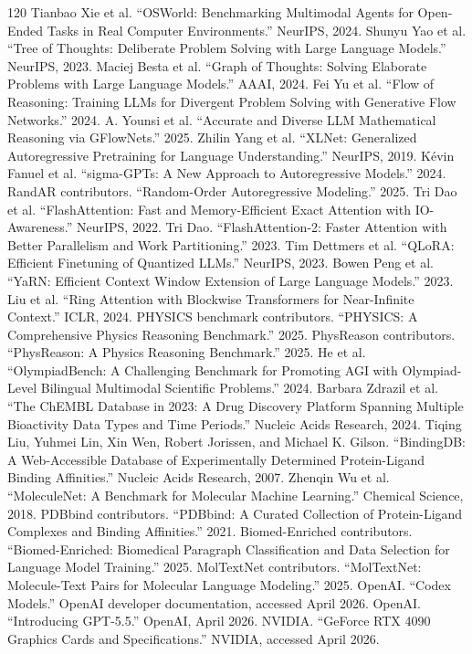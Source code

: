 \documentclass[11pt]{article}
\newcommand{\1}{\mathbf{1}}
\begin{document}
\begin{thebibliography}{120}
 Tianbao Xie et al. ``OSWorld: Benchmarking Multimodal Agents for Open-Ended Tasks in Real Computer Environments.'' NeurIPS, 2024.
 Shunyu Yao et al. ``Tree of Thoughts: Deliberate Problem Solving with Large Language Models.'' NeurIPS, 2023.
 Maciej Besta et al. ``Graph of Thoughts: Solving Elaborate Problems with Large Language Models.'' AAAI, 2024.
 Fei Yu et al. ``Flow of Reasoning: Training LLMs for Divergent Problem Solving with Generative Flow Networks.'' 2024.
 A. Younsi et al. ``Accurate and Diverse LLM Mathematical Reasoning via GFlowNets.'' 2025.
 Zhilin Yang et al. ``XLNet: Generalized Autoregressive Pretraining for Language Understanding.'' NeurIPS, 2019.
 Kévin Fanuel et al. ``sigma-GPTs: A New Approach to Autoregressive Models.'' 2024.
 RandAR contributors. ``Random-Order Autoregressive Modeling.'' 2025.
 Tri Dao et al. ``FlashAttention: Fast and Memory-Efficient Exact Attention with IO-Awareness.'' NeurIPS, 2022.
 Tri Dao. ``FlashAttention-2: Faster Attention with Better Parallelism and Work Partitioning.'' 2023.
 Tim Dettmers et al. ``QLoRA: Efficient Finetuning of Quantized LLMs.'' NeurIPS, 2023.
 Bowen Peng et al. ``YaRN: Efficient Context Window Extension of Large Language Models.'' 2023.
 Liu et al. ``Ring Attention with Blockwise Transformers for Near-Infinite Context.'' ICLR, 2024.
 PHYSICS benchmark contributors. ``PHYSICS: A Comprehensive Physics Reasoning Benchmark.'' 2025.
 PhysReason contributors. ``PhysReason: A Physics Reasoning Benchmark.'' 2025.
 He et al. ``OlympiadBench: A Challenging Benchmark for Promoting AGI with Olympiad-Level Bilingual Multimodal Scientific Problems.'' 2024.
 Barbara Zdrazil et al. ``The ChEMBL Database in 2023: A Drug Discovery Platform Spanning Multiple Bioactivity Data Types and Time Periods.'' Nucleic Acids Research, 2024.
 Tiqing Liu, Yuhmei Lin, Xin Wen, Robert Jorissen, and Michael K. Gilson. ``BindingDB: A Web-Accessible Database of Experimentally Determined Protein-Ligand Binding Affinities.'' Nucleic Acids Research, 2007.
 Zhenqin Wu et al. ``MoleculeNet: A Benchmark for Molecular Machine Learning.'' Chemical Science, 2018.
 PDBbind contributors. ``PDBbind: A Curated Collection of Protein-Ligand Complexes and Binding Affinities.'' 2021.
 Biomed-Enriched contributors. ``Biomed-Enriched: Biomedical Paragraph Classification and Data Selection for Language Model Training.'' 2025.
 MolTextNet contributors. ``MolTextNet: Molecule-Text Pairs for Molecular Language Modeling.'' 2025.
 OpenAI. ``Codex Models.'' OpenAI developer documentation, accessed April 2026.
 OpenAI. ``Introducing GPT-5.5.'' OpenAI, April 2026.
 NVIDIA. ``GeForce RTX 4090 Graphics Cards and Specifications.'' NVIDIA, accessed April 2026.

\end{thebibliography}
\end{document}
